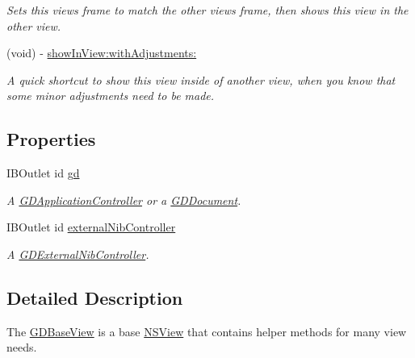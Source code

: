 \begin{DoxyCompactItemize}
\begin{DoxyCompactList}\small\item\em Sets this views frame to match the other views frame, then shows this view in the other view. \item\end{DoxyCompactList}\item 
(void) -\/ \hyperlink{interface_g_d_base_view_adc1a971ea59f4d48174901c94c48e8a0}{showInView:withAdjustments:}
\begin{DoxyCompactList}\small\item\em A quick shortcut to show this view inside of another view, when you know that some minor adjustments need to be made. \item\end{DoxyCompactList}\end{DoxyCompactItemize}
\subsection*{Properties}
\begin{DoxyCompactItemize}
\item 
\hypertarget{interface_g_d_base_view_a61c39a91d3844a860a2a7351e61aee0e}{
IBOutlet id \hyperlink{interface_g_d_base_view_a61c39a91d3844a860a2a7351e61aee0e}{gd}}
\label{interface_g_d_base_view_a61c39a91d3844a860a2a7351e61aee0e}

\begin{DoxyCompactList}\small\item\em A \hyperlink{interface_g_d_application_controller}{GDApplicationController} or a \hyperlink{interface_g_d_document}{GDDocument}. \item\end{DoxyCompactList}\item 
\hypertarget{interface_g_d_base_view_aeb77c9580ca6da0892bd407ae19ef79c}{
IBOutlet id \hyperlink{interface_g_d_base_view_aeb77c9580ca6da0892bd407ae19ef79c}{externalNibController}}
\label{interface_g_d_base_view_aeb77c9580ca6da0892bd407ae19ef79c}

\begin{DoxyCompactList}\small\item\em A \hyperlink{interface_g_d_external_nib_controller}{GDExternalNibController}. \item\end{DoxyCompactList}\end{DoxyCompactItemize}


\subsection{Detailed Description}
The \hyperlink{interface_g_d_base_view}{GDBaseView} is a base \hyperlink{class_n_s_view}{NSView} that contains helper methods for many view needs. 

